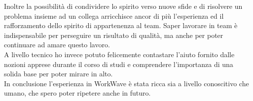 Inoltre la possibilità di condividere lo spirito verso nuove sfide e di risolvere un problema insieme ad un collega arricchisce ancor di più l'esperienza ed il rafforzamento dello spirito di appartenenza al team. Saper lavorare in team è indispensabile per perseguire un risultato di qualità, ma anche per poter continuare ad amare questo lavoro. \\

A livello tecnico ho invece potuto felicemente contastare l'aiuto fornito dalle nozioni apprese durante il corso di studi e comprendere l'importanza di una solida base per poter mirare in alto. \\

In conclusione l'esperienza in WorkWave è stata ricca sia a livello conoscitivo che umano, che spero poter ripetere anche in futuro.
